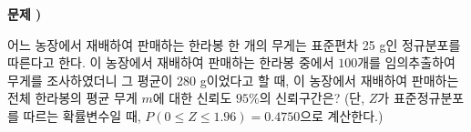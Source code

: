\documentclass[a4paper]{oblivoir}
\newcounter{num}
\newcommand\prob[1]
{\vs\bigskip\bigskip\par\noindent\stepcounter{num} \textbf{문제 \thenum) #1}\par\noindent}
\newcommand\vs[1]{\vspace{25pt}}
\begin{document}
\prob{}
어느 농장에서 재배하여 판매하는 한라봉 한 개의 무게는 표준편차 25 g인 정규분포를 따른다고 한다.
이 농장에서 재배하여 판매하는 한라봉 중에서 \(100\)개를 임의추출하여 무게를 조사하였더니 그 평균이 280 g이었다고 할 때, 이 농장에서 재배하여 판매하는 전체 한라봉의 평균 무게 \(m\)에 대한 신뢰도 \(95\%\)의 신뢰구간은?
(단, \(Z\)가 표준정규분포를 따르는 확률변수일 때, \(P(0\le Z\le1.96)=0.4750\)으로 계산한다.)
\par\bigskip
\par\noindent
{}
\tab{}\:\\
\tab{}\:
\tab{}\:\\
\tab{}\:
\end{document}
